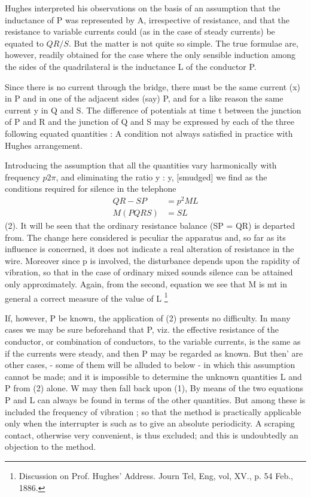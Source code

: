 Hughes interpreted his observations on the basis of an assumption that the
inductance of P was represented by A, irrespective of resistance, and that the
resistance to variable currents could (as in the case of steady currents) be
equated to \(QR/S\).  But the matter is not quite so simple. The true formulae are,
however, readily obtained for the case where the only sensible induction among
the sides of the quadrilateral is the inductance L of the conductor P.

Since there is no current through the bridge, there must be the same current
(x) in P and in one of the adjacent sides (say) P, and for a like reason the
same current y in Q and S. The difference of potentials at time t between the
junction of P and R and the junction of Q and S may be expressed by each of the
three following equated quantities :  A condition not always satisfied in
practice with Hughes arrangement.

Introducing the assumption that all the quantities vary harmonically with
frequency \(p 2 \pi\), and eliminating the ratio y : y,
[smudged]
we find as the conditions required for silence in the telephone
\begin{align}
QR-SP & = p^2 ML \nonumber \\
M(P Q R S) & = S L  \nonumber
\end{align}
(2).  It will be seen that the ordinary resistance balance (SP = QR)
is departed from. The change here considered is peculiar the apparatus
and, so far as its influence is concerned, it does not indicate a real
alteration of resistance in the wire. Moreover since p is involved, the
disturbance depends upon the rapidity of vibration, so that in the case of
ordinary mixed sounds silence can be attained only approximately. Again, from
the second, equation we see that M is mt in general a correct measure of the
value of L \footnote{Discussion on Prof. Hughes’ Address. Journ Tel, Eng, vol,
XV., p. 54  Feb., 1886.}

If, however, P be known, the application of (2) presents no difficulty. In many
cases we may be sure beforehand that P, viz. the effective resistance of the
conductor, or combination of conductors, to the variable currents, is the same
as if the currents were steady, and then P may be regarded as known. But
then' are other cases, - some of them will be alluded to below - in which this
assumption cannot be made; and it is impossible to determine the unknown
quantities L and P from (2) alone. W may then fall back upon (1), By means of
the two equations P and L can always be found in terms of the other quantities.
But among these is included the frequency of vibration ; so that
the method is practically applicable only when the interrupter is
such as to give an absolute periodicity. A scraping contact,
otherwise very convenient, is thus excluded; and this is
undoubtedly an objection to the method.

